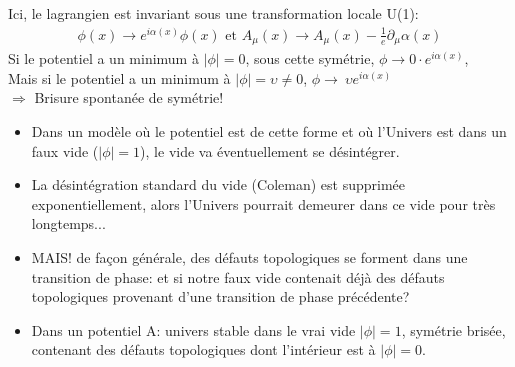 \documentclass{beamer}
\begin{document}
\begin{frame}
\begin{figure}
\end{figure}
Ici, le lagrangien est invariant sous une transformation locale U(1): 
\begin{equation*}
\begin{array}{l}
\phi (x) \rightarrow e^{i \alpha (x)} \phi (x) \text{   et   }  A_\mu (x) \rightarrow A_\mu(x)-\frac{1}{e} \partial_{\mu} \alpha (x)
\end{array}
\end{equation*} 
Si le potentiel a un minimum à $|\phi| =0$, sous cette symétrie, $\phi\rightarrow 0 \cdot e^{i \alpha (x)} $,\\
Mais si le potentiel a un minimum à $|\phi| = \upsilon \neq 0$, $\phi\rightarrow\ \upsilon e^{i \alpha (x)}$\\
$\Rightarrow$ Brisure spontanée de symétrie!
\end{frame}


\begin{frame}
\begin{itemize}
\item<1-> Dans un modèle où le potentiel est de cette forme et où l'Univers est dans un faux vide ($|\phi|=1$), le vide va éventuellement se désintégrer.
\item<2-> La désintégration standard du vide (Coleman) est supprimée exponentiellement, alors l'Univers pourrait demeurer dans ce vide pour très longtemps...
\item<3-> MAIS! de façon générale, des défauts topologiques se forment dans une transition de phase: et si notre faux vide contenait déjà des défauts topologiques provenant d'une transition de phase précédente?
\end{itemize}
\end{frame}




\begin{frame}
\begin{itemize}
\item Dans un potentiel A: univers stable dans le vrai vide $|\phi|=1$, symétrie brisée, contenant des défauts topologiques dont l'intérieur est à $|\phi|=0$.
\end{itemize}
\end{frame}
\end{document}
